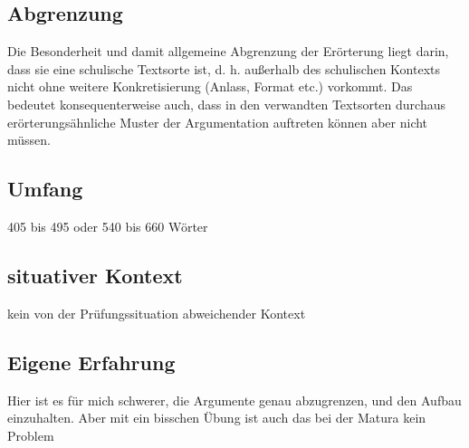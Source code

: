 \subsection{Abgrenzung}
Die Besonderheit und damit allgemeine Abgrenzung der Erörterung
liegt darin, dass sie eine schulische Textsorte ist, d. h. außerhalb des
schulischen Kontexts nicht ohne weitere Konkretisierung (Anlass, Format etc.) vorkommt. Das bedeutet konsequenterweise auch, dass in
den verwandten Textsorten durchaus erörterungsähnliche Muster der
Argumentation auftreten können aber nicht müssen.

\subsection{Umfang}
405 bis 495 oder 540 bis 660 Wörter

\subsection{situativer Kontext}
kein von der Prüfungssituation abweichender Kontext
\subsection{Eigene Erfahrung} 
Hier ist es für mich schwerer, die Argumente genau abzugrenzen, und den Aufbau einzuhalten. Aber mit ein bisschen Übung ist auch das bei der Matura kein Problem